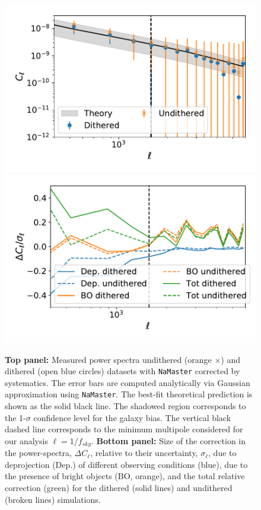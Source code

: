\documentclass[twocolumn]{aastex62}
\begin{document}
\begin{figure}
\centering
\includegraphics[width=0.9\columnwidth]{Cl_results_2019_comp}
\includegraphics[width=0.9\columnwidth]{systematics_comp_abs}
\caption{{\bf Top panel:} Measured power spectra undithered (orange $\times$) and dithered (open blue circles) datasets with \texttt{NaMaster} corrected by systematics. The error bars are computed analytically via Gaussian approximation using \texttt{NaMaster}. The best-fit theoretical prediction is shown as the solid black line. The shadowed region corresponds to the 1-$\sigma$ confidence level for the galaxy bias. The vertical black dashed line corresponds to the minimum multipole considered for our analysis $\ell = 1/f_{sky}$. {\bf Bottom panel:} Size of the correction in the power-spectra, $\Delta C_{\ell}$, relative to their uncertainty, $\sigma_{\ell}$, due to deprojection (Dep.) of different observing conditions (blue), due to the presence of bright objects (BO, orange), and the total relative correction (green) for the dithered (solid lines) and undithered (broken lines) simulations.}
\label{fig:power_spectra}
\end{figure}
\end{document}
